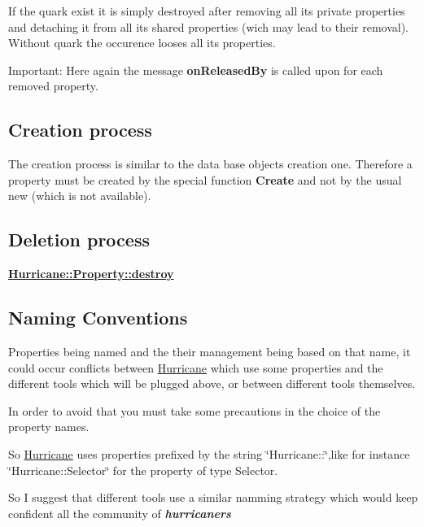 If the quark exist it is simply destroyed after removing all its private properties and detaching it from all its shared properties (wich may lead to their removal). Without quark the occurence looses all its properties.

\begin{DoxyParagraph}{Important\+:}
Here again the message {\bfseries on\+Released\+By} is called upon for each removed property.
\end{DoxyParagraph}
\hypertarget{classHurricane_1_1Property_secPropertyCreationProcess}{}\subsection{Creation process}\label{classHurricane_1_1Property_secPropertyCreationProcess}
The creation process is similar to the data base objects creation one. Therefore a property must be created by the special function {\bfseries Create} and not by the usual new (which is not available).\hypertarget{classHurricane_1_1Property_secPropertyDeletionProcess}{}\subsection{Deletion process}\label{classHurricane_1_1Property_secPropertyDeletionProcess}
{\bfseries \hyperlink{classHurricane_1_1Property_ab60362699e6c6ea35ace45dbd1075a2f}{Hurricane\+::\+Property\+::destroy}}\hypertarget{classHurricane_1_1Property_secPropertyNaming}{}\subsection{Naming Conventions}\label{classHurricane_1_1Property_secPropertyNaming}
Properties being named and the their management being based on that name, it could occur conflicts between \hyperlink{namespaceHurricane}{Hurricane} which use some properties and the different tools which will be plugged above, or between different tools themselves.

In order to avoid that you must take some precautions in the choice of the property names.

So \hyperlink{namespaceHurricane}{Hurricane} uses properties prefixed by the string \char`\"{}\+Hurricane\+::\char`\"{},like for instance \char`\"{}\+Hurricane\+::\+Selector\char`\"{} for the property of type Selector.

So I suggest that different tools use a similar namming strategy which would keep confident all the community of {\bfseries {\itshape hurricaners}}

